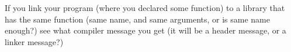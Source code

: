 
If you link your program (where you declared some function) to a library that has the same function
(same name, and same arguments, or is same name enough?)
see what compiler message you get
(it will be a header message, or a linker message?)
